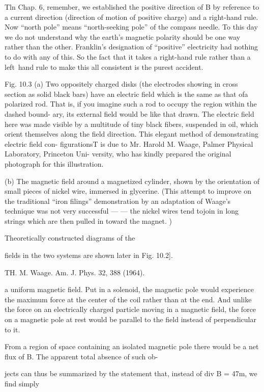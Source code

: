 Tln Chap. 6, remember, we established the positive direction of B by reference to a
current direction (direction of motion of positive charge) and a right-hand rule. Now
``north pole'' means ``north-seeking pole'' of the compass needle. To this day we do
not understand why the earth's magnetic polarity should be one way rather than the
other. Franklin's designation of ``positive'' electricity had nothing to do with any of
this. So the fact that it takes a right-hand rule rather than a left~hand rule to make
this all consistent is the purest accident.

Fig. 10.3 (a) Two oppositely charged
disks (the electrodes showing in cross section
as solid black bars) have an electric
field which is the same as that ofa polarized
rod. That is, if you imagine such a rod to
occupy the region within the dashed bound-
ary, its external field would be like that
drawn. The electric field here was made
visible by a multitude of tiny black fibers,
suspended in oil, which orient themselves
along the field direction. This elegant
method of demonstrating electric field con-
figurationsT is due to Mr. Harold M. Waage,
Palmer Physical Laboratory, Princeton Uni-
versity, who has kindly prepared the original
photograph for this illustration.

(b) The magnetic field around a magnetized
cylinder, shown by the orientation
of small pieces of nickel wire, immersed in
glycerine. (This attempt to improve on
the traditional ``iron filings'' demonstration
by an adaptation of Waage's technique was
not very successful ---  --- the nickel wires tend
tojoin in long strings which are then pulled
in toward the magnet. )

Theoretically constructed diagrams of the

fields in the two systems are shown later in
Fig. 10.2].

TH. M. Waage. Am. J. Phys. 32, 388 (1964).

a uniform magnetic field. Put in a solenoid, the magnetic pole would
experience the maximum force at the center of the coil rather than
at the end. And unlike the force on an electrically charged particle
moving in a magnetic field, the force on a magnetic pole at rest would
be parallel to the field instead of perpendicular to it.

From a region of space containing an isolated magnetic pole there
would be a net flux of B. The apparent total absence of such ob-

jects can thus be summarized by the statement that, instead of
div B = 47m, we find simply

